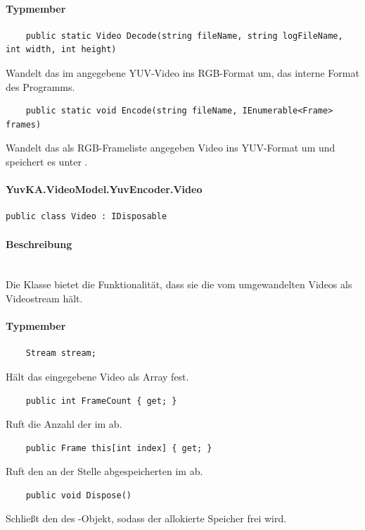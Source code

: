 \paragraph{Typmember}
\begin{itemize}

	\begin{verbatim}
	public static Video Decode(string fileName, string logFileName, int width, int height)
	\end{verbatim}
	Wandelt das im  angegebene YUV-Video ins RGB-Format um, das interne Format des Programms. 

	\begin{verbatim}
	public static void Encode(string fileName, IEnumerable<Frame> frames)
	\end{verbatim}
	Wandelt das als RGB-Frameliste angegeben Video ins YUV-Format um und speichert es unter . 

\end{itemize}
\setcounter{secnumdepth}{4}
\paragraph{YuvKA.VideoModel.YuvEncoder.Video}
\setcounter{secnumdepth}{3}
\begin{verbatim}
public class Video : IDisposable
\end{verbatim}

\paragraph{Beschreibung}~\\
Die Klasse  bietet die Funktionalität, dass sie die vom  umgewandelten Videos als Videostream hält.

\paragraph{Typmember}
\begin{itemize}

	\begin{verbatim}
	Stream stream;
	\end{verbatim}
	Hält das eingegebene Video als Array fest.

	\begin{verbatim}
	public int FrameCount { get; }
	\end{verbatim}
	Ruft die Anzahl der  im  ab.

	\begin{verbatim}
	public Frame this[int index] { get; }
	\end{verbatim}
	Ruft den an der Stelle  abgespeicherten  im  ab.

	\begin{verbatim}
	public void Dispose()
	\end{verbatim}
	Schließt den  des -Objekt, sodass der allokierte Speicher frei wird.

\end{itemize}

